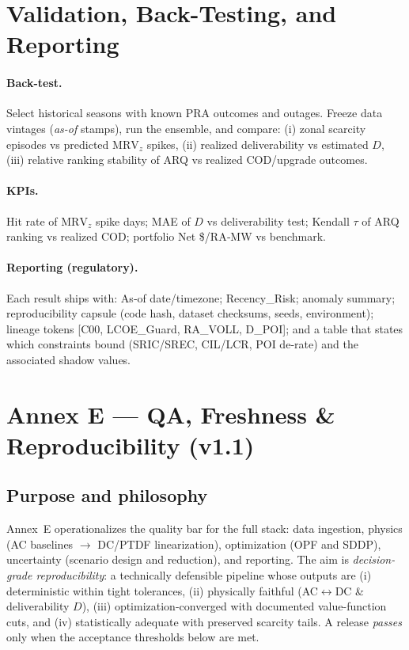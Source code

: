 \documentclass[11pt]{article}
\newcommand{\MRV}{\ensuremath{\mathrm{MRV}}}
\numberwithin{equation}{section}
\theoremstyle{definition}
\theoremstyle{remark}
\begin{document}
\section{Validation, Back-Testing, and Reporting}
\label{sec:validation}

\paragraph{Back-test.}
Select historical seasons with known PRA outcomes and outages.
Freeze data vintages (\textit{as-of} stamps), run the ensemble, and compare:
(i) zonal scarcity episodes vs predicted \(\MRV_z\) spikes,
(ii) realized deliverability vs estimated \(D\),
(iii) relative ranking stability of ARQ vs realized COD/upgrade outcomes.

\paragraph{KPIs.}
Hit rate of \(\MRV_z\) spike days; MAE of \(D\) vs deliverability test; Kendall \(\tau\) of ARQ ranking vs realized COD; portfolio Net \$/RA‑MW vs benchmark.

\paragraph{Reporting (regulatory).}
Each result ships with: As‑of date/timezone; Recency\_Risk; anomaly summary; reproducibility capsule (code hash, dataset checksums, seeds, environment); lineage tokens [C00, LCOE\_Guard, RA\_VOLL, D\_POI]; and a table that states which constraints bound (SRIC/SREC, CIL/LCR, POI de‑rate) and the associated shadow values.

\newpage

\section{Annex E — QA, Freshness \& Reproducibility (v1.1)}
\label{annex:E}

\subsection*{Purpose and philosophy}
Annex~E operationalizes the quality bar for the full stack: data ingestion, physics (AC baselines $\rightarrow$ DC/PTDF linearization), optimization (OPF and SDDP), uncertainty (scenario design and reduction), and reporting. The aim is \emph{decision-grade reproducibility}: a technically defensible pipeline whose outputs are (i) deterministic within tight tolerances, (ii) physically faithful (AC$\leftrightarrow$DC \& deliverability $D$), (iii) optimization-converged with documented value-function cuts, and (iv) statistically adequate with preserved scarcity tails. A release \emph{passes} only when the acceptance thresholds below are met.
\end{document}

